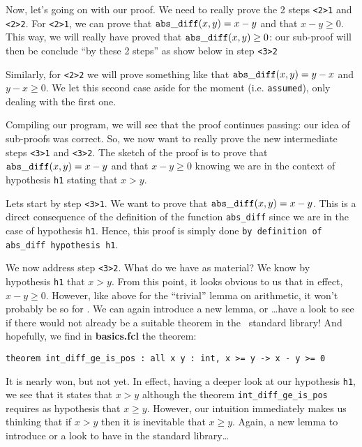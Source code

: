 \documentclass[11pt,a4paper,twoside,onecolumn,fullpage]{article}
\begin{document}
\medskip
Now, let's going on with our proof. We need to really prove the 2
steps \lstinline"<2>1" and \lstinline"<2>2". For \lstinline"<2>1", we
can prove that ${\tt abs\_diff} (x, y) = x - y$ and that
$x - y \ge 0$. This way, we will really have proved that
${\tt abs\_diff} (x, y) \ge 0$: our sub-proof will then be conclude ``by
these 2 steps'' as show below in step \lstinline"<3>2"

Similarly, for \lstinline"<2>2" we will prove something like that
${\tt abs\_diff} (x, y) = y - x$ and $y - x \ge 0$. We let this second case
aside for the moment (i.e. \lstinline"assumed"), only dealing with the
first one.

{\scriptsize
}

Compiling our program, we will see that the proof continues passing:
our idea of sub-proofs was correct. So, we now want to really prove
the new intermediate steps \lstinline"<3>1" and \lstinline"<3>2". The
sketch of the proof is to prove that ${\tt abs\_diff} (x, y) = x - y$ and
that $x - y \ge 0$ knowing we are in the context of hypothesis
\lstinline"h1" stating that $x > y$.

Lets start by step \lstinline"<3>1". We want to prove that
${\tt abs\_diff} (x, y) = x - y$.
This is a direct consequence of the definition of the function
\lstinline"abs_diff" since we are in the case of hypothesis
\lstinline"h1". Hence, this proof is simply done
\lstinline"by definition of abs_diff hypothesis h1".

We now address step \lstinline"<3>2".  What do we have as material? We
know by hypothesis \lstinline"h1" that $x>y$. From this point, it looks
obvious to us that in effect,  $x - y \ge 0$. However, like above for
the ``trivial'' lemma on arithmetic, it won't probably be so for
\zenon. We can again introduce a new lemma, or \ldots have a look to
see if there would not already be a suitable theorem in the \focal\
standard library! And hopefully, we find in \textbf{basics.fcl} the
theorem:

{\scriptsize
\begin{lstlisting}
theorem int_diff_ge_is_pos : all x y : int, x >= y -> x - y >= 0
\end{lstlisting}}

It is nearly won, but not yet. In effect, having a deeper look at our
hypothesis \lstinline"h1", we see that it states that $x > y$ although
the theorem \lstinline"int_diff_ge_is_pos" requires as hypothesis that
$x \ge y$. However, our intuition immediately makes us thinking that if
$x > y$ then it is inevitable that $x \ge y$. Again, a new lemma to
introduce or a look to have in the standard library\ldots
\end{document}
